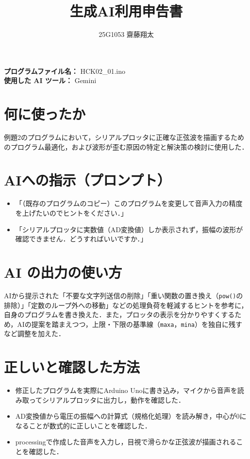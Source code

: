 \documentclass[uplatex,dvipdfmx]{jlreq}
\begin{document}
\title{生成AI利用申告書}
\author{25G1053 齋藤翔太}
\maketitle
\noindent
\textbf{プログラムファイル名：} HCK02\_01.ino \\
\textbf{使用した AI ツール：} Gemini
\section{何に使ったか}
例題2のプログラムにおいて，シリアルプロッタに正確な正弦波を描画するためのプログラム最適化，および波形が歪む原因の特定と解決策の検討に使用した．

\section{AIへの指示（プロンプト）}
\begin{itemize}
    \item 「（既存のプログラムのコピー）このプログラムを変更して音声入力の精度を上げたいのでヒントをください．」
    \item 「シリアルプロッタに実数値（AD変換値）しか表示されず，振幅の波形が確認できません．どうすればいいですか．」
\end{itemize}

\section{AI の出力の使い方}
AIから提示された「不要な文字列送信の削除」「重い関数の置き換え（\texttt{pow()}の排除）」「定数のループ外への移動」などの処理負荷を軽減するヒントを参考に，自身のプログラムを書き換えた．また，プロッタの表示を分かりやすくするため，AIの提案を踏まえつつ，上限・下限の基準線（\texttt{maxa}，\texttt{mina}）を独自に残すなど調整を加えた．

\section{正しいと確認した方法}
\begin{itemize}
    \item 修正したプログラムを実際にArduino Unoに書き込み，マイクから音声を読み取ってシリアルプロッタに出力し，動作を確認した．
    \item AD変換値から電圧の振幅への計算式（規格化処理）を読み解き，中心が0になることが数式的に正しいことを確認した．
    \item processingで作成した音声を入力し，目視で滑らかな正弦波が描画されることを確認した．
\end{itemize}
\end{document}
